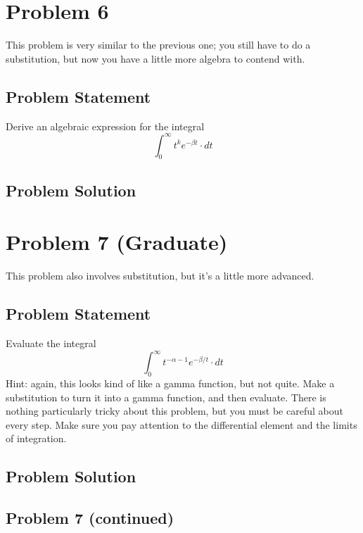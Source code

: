 \documentclass[12pt]{article}
\theoremstyle{definition}
\begin{document}
\newpage
\section*{Problem 6}

This problem is very similar to the previous one; you still have to do a substitution, but now you have a little more algebra to contend with.

\subsection*{Problem Statement}

Derive an algebraic expression for the integral
$$
\int_0^\infty t^k e^{-\beta t} \cdot dt
$$

\subsection*{Problem Solution}



\newpage
\section*{Problem 7 (Graduate)}

This problem also involves substitution, but it's a little more advanced.

\subsection*{Problem Statement}

Evaluate the integral
$$
\int_0^\infty t^{-\alpha- 1} e^{-\beta/t} \cdot dt
$$
Hint: again, this looks kind of like a gamma function, but not quite. Make a substitution to turn it into a gamma function, and then evaluate. There is nothing particularly tricky about this problem, but you must be careful about every step. Make sure you pay attention to the differential element and the limits of integration.

\subsection*{Problem Solution}

\newpage
\subsection*{Problem 7 (continued)}
\end{document}
